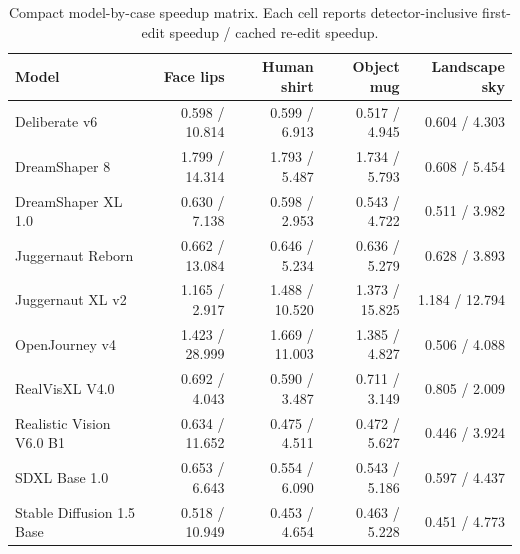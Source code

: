 \documentclass[final,5p,times,number,sort&compress]{elsarticle}
\begin{document}
\begin{table}[h]
\centering
\scriptsize
\setlength{\tabcolsep}{3pt}
\caption{Compact model-by-case speedup matrix. Each cell reports detector-inclusive first-edit speedup / cached re-edit speedup.}
\label{tab:matrix-small}
\begin{tabular}{lrrrr}
\toprule
Model & Face lips & Human shirt & Object mug & Landscape sky \\
\midrule
Deliberate v6 & 0.598 / 10.814 & 0.599 / 6.913 & 0.517 / 4.945 & 0.604 / 4.303 \\
DreamShaper 8 & 1.799 / 14.314 & 1.793 / 5.487 & 1.734 / 5.793 & 0.608 / 5.454 \\
DreamShaper XL 1.0 & 0.630 / 7.138 & 0.598 / 2.953 & 0.543 / 4.722 & 0.511 / 3.982 \\
Juggernaut Reborn & 0.662 / 13.084 & 0.646 / 5.234 & 0.636 / 5.279 & 0.628 / 3.893 \\
Juggernaut XL v2 & 1.165 / 2.917 & 1.488 / 10.520 & 1.373 / 15.825 & 1.184 / 12.794 \\
OpenJourney v4 & 1.423 / 28.999 & 1.669 / 11.003 & 1.385 / 4.827 & 0.506 / 4.088 \\
RealVisXL V4.0 & 0.692 / 4.043 & 0.590 / 3.487 & 0.711 / 3.149 & 0.805 / 2.009 \\
Realistic Vision V6.0 B1 & 0.634 / 11.652 & 0.475 / 4.511 & 0.472 / 5.627 & 0.446 / 3.924 \\
SDXL Base 1.0 & 0.653 / 6.643 & 0.554 / 6.090 & 0.543 / 5.186 & 0.597 / 4.437 \\
Stable Diffusion 1.5 Base & 0.518 / 10.949 & 0.453 / 4.654 & 0.463 / 5.228 & 0.451 / 4.773 \\
\bottomrule
\end{tabular}
\end{table}



\end{document}
